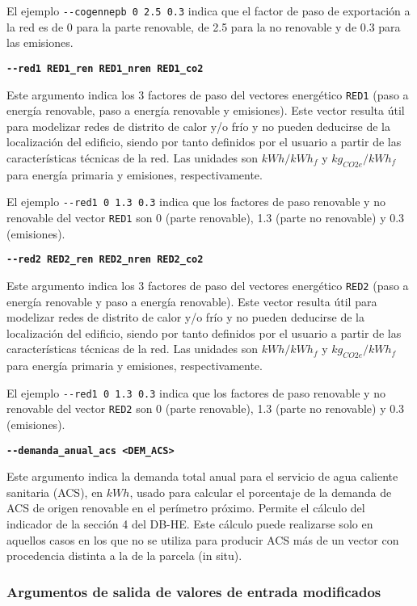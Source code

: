 \documentclass[10pt,notitlepage,oneside,a4paper]{article}
\begin{document}
El ejemplo \texttt{-{}-cogennepb 0 2.5 0.3} indica que el factor de paso de exportación a la red es de 0 para la parte renovable, de 2.5 para la no renovable y de 0.3 para las emisiones.

\textbf{\texttt{-{}-red1 RED1\_ren RED1\_nren RED1\_co2}}

Este argumento indica los 3 factores de paso del vectores energético \texttt{RED1} (paso a energía renovable, paso a energía renovable y emisiones). Este vector resulta útil para modelizar redes de distrito de calor y/o frío y no pueden deducirse de la localización del edificio, siendo por tanto definidos por el usuario a partir de las características técnicas de la red. Las unidades son $kWh/kWh_f$ y $kg_{CO2e}/kWh_f$ para energía primaria y emisiones, respectivamente.

El ejemplo \texttt{-{}-red1 0 1.3 0.3} indica que los factores de paso renovable y no renovable del vector \texttt{RED1} son 0 (parte renovable), 1.3 (parte no renovable) y 0.3 (emisiones).

\textbf{\texttt{-{}-red2 RED2\_ren RED2\_nren RED2\_co2}}

Este argumento indica los 3 factores de paso del vectores energético \texttt{RED2} (paso a energía renovable y paso a energía renovable). Este vector resulta útil para modelizar redes de distrito de calor y/o frío y no pueden deducirse de la localización del edificio, siendo por tanto definidos por el usuario a partir de las características técnicas de la red. Las unidades son $kWh/kWh_f$ y $kg_{CO2e}/kWh_f$ para energía primaria y emisiones, respectivamente.

El ejemplo \texttt{-{}-red1 0 1.3 0.3} indica que los factores de paso renovable y no renovable del vector \texttt{RED2} son 0 (parte renovable), 1.3 (parte no renovable) y 0.3 (emisiones).

\textbf{\texttt{-{}-demanda\_anual\_acs <DEM\_ACS>}}

Este argumento indica la demanda total anual para el servicio de agua caliente sanitaria (ACS), en  $kWh$, usado para calcular el porcentaje de la demanda de ACS de origen renovable en el perímetro próximo. Permite el cálculo del indicador de la sección 4 del DB-HE. Este cálculo puede realizarse solo en aquellos casos en los que no se utiliza para producir ACS más de un vector con procedencia distinta a la de la parcela (in situ).

\subsubsection{Argumentos de salida de valores de entrada modificados}
\end{document}
